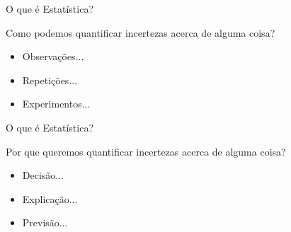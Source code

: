 \documentclass{beamer}\usepackage[]{graphicx}\usepackage[]{color}
\begin{document}
\begin{frame}{O que é Estatística?}

  Como podemos quantificar incertezas acerca de alguma coisa? \pause
  
  \vfill
  
  \begin{itemize}
  
    \item{Observações...}
    
    \vfill
    
    \item{Repetições...}
    
    \vfill
    
    \item{Experimentos...} 
  
  \end{itemize}
    
\end{frame}

\begin{frame}{O que é Estatística?}

  Por que queremos quantificar incertezas acerca de alguma coisa? \pause
  
  \vfill
  
  \begin{itemize}
  
    \item{Decisão...}
    
    \vfill
    
    \item{Explicação...}
    
    \vfill
    
    \item{Previsão...} 
  
  \end{itemize}
    
\end{frame}
\end{document}
